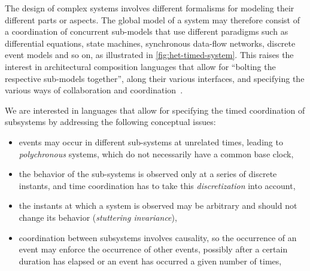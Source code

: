%
\begin{isabellebody}%
%
%
\isadelimdocument
%
\endisadelimdocument
%
\isatagdocument
%
\isamarkuptrue%
%
\endisatagdocument
{\isafolddocument}%
%
\isadelimdocument
%
\endisadelimdocument
%
\isadelimtheory
%
\endisadelimtheory
%
\isatagtheory
%
\endisatagtheory
{\isafoldtheory}%
%
\isadelimtheory
%
\endisadelimtheory
%
\isadelimdocument
%
\endisadelimdocument
%
\isatagdocument
%
\isamarkuptrue%
%
\endisatagdocument
{\isafolddocument}%
%
\isadelimdocument
%
\endisadelimdocument
%
\begin{isamarkuptext}%
The design of complex systems involves different formalisms for modeling their different parts or 
aspects. The global model of a system may therefore consist of a coordination of concurrent 
sub-models that use different paradigms such as differential equations, state machines, 
synchronous data-flow networks, 
discrete event models and so on, as illustrated in \autoref{fig:het-timed-system}. 
This raises the interest in architectural composition languages 
that allow for ``bolting the respective sub-models together'', along their various interfaces, and 
specifying the various ways of collaboration and coordination~\cite{nguyenvan:hal-01583815}.

We are interested in languages that allow for specifying the timed coordination of subsystems by 
addressing the following conceptual issues:

%
\begin{itemize}%
\item events may occur in different sub-systems at unrelated times, leading to \emph{polychronous} systems, 
which do not necessarily have a common base clock,

\item the behavior of the sub-systems is observed only at a series of discrete instants, and time 
coordination has to take this \emph{discretization} into account,

\item the instants at which a system is observed may be arbitrary and should not change its behavior 
(\emph{stuttering invariance}),

\item coordination between subsystems involves causality, so the occurrence of an event may enforce 
the occurrence of other events, possibly after a certain duration has elapsed or an event has 
occurred a given number of times,


\end{itemize}
\end{isamarkuptext}
\end{isabellebody}
